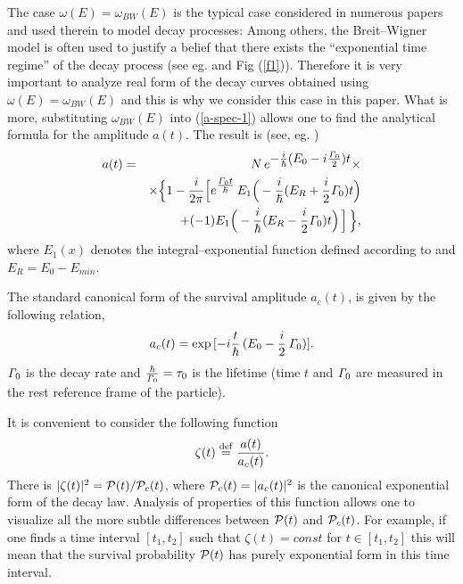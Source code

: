 \documentclass[12pt]{article}
\begin{document}
The case $\omega (E) = \omega_{BW}(E)$ is the typical case considered  in  numerous papers
and used therein  to model decay processes:
Among others, the Breit--Wigner model is often used to justify a belief  that there exists 
the ``exponential time regime'' of the decay process (see eg. \cite{peshkin,sluis} and Fig (\ref{f1})).
Therefore it is very important to analyze real form of the decay curves obtained using
$\omega (E) = \omega_{BW}(E)$ and this is why we consider this case in this paper. What is more,
substituting  $\omega_{BW}(E)$ into (\ref{a-spec-1}) allows one to find the analytical formula for the
amplitude $a(t)$. The result is  (see, eg. \cite{sluis,ku-2008,ku-2009})
\begin{eqnarray}
a(t) &=& N\,e^{\textstyle{- \frac{i}{\hbar} (E_{0} -
i\frac{{\it\Gamma}_{0}}{2})t}} \times \nonumber\\
&&\times \Big\{1 - \frac{i}{2\pi} \Big[
e^{\textstyle{\frac{{\it\Gamma}_{0}t}{\hbar}}}\,
E_{1}\Big(-\frac{i}{\hbar}(E_{R}
+ \frac{i}{2} {\it\Gamma}_{0})t\Big) \nonumber\\
&&\;\;\;\;\;+ (-1) E_{1}\Big(- \frac{i}{\hbar}(E_{R} -
\frac{i}{2} {\it\Gamma}_{0})t\Big)\,\Big]\, \Big\}, \label{a-E(1)}
\end{eqnarray}
where $E_{1}(x)$ denotes the integral--exponential function defined according to
\cite{abramowitz} and $E_{R} = E_{0} - E_{min}$.


The standard canonical form of the survival amplitude $a_{c}(t)$, is given by the following relation,
\begin{equation}
a_{c}(t) = \exp\,[{-i\frac{t}{\hbar}\,(E_{0} - \frac{i}{2}\,{\it\Gamma}_{0})}].
\end{equation}
${\it\Gamma}_{0}$ is the decay rate and $\frac{\hbar}{{\it\Gamma}_{0}} = \tau_{0}$ is the lifetime  (time $t$ and ${\it\Gamma}_{0}$
are measured in the rest reference frame of the particle).

It is convenient to consider the following function
\begin{equation}
\zeta (t) \stackrel{\rm def}{=} \frac{a(t)}{a_{c}(t)}. \label{zeta}
\end{equation}
There is $|\zeta (t)|^{2} = {\cal P}(t)/{\cal P}_{c}(t)$,
where ${\cal P}_{c}(t) = |a_{c}(t)|^{2}$ is the canonical exponential form of the decay law.
Analysis of properties of this function allows one to visualize all the more subtle differences between ${\cal P}(t)$ and
${\cal P}_{c}(t)$. For example, if one finds a time interval $[t_{1},t_{2}]$  such that  $\zeta (t) =const$ for $t \in [t_{1},t_{2}]$ this will mean that the survival probability
${\cal P}(t)$ has purely exponential form in this time interval.
\end{document}

